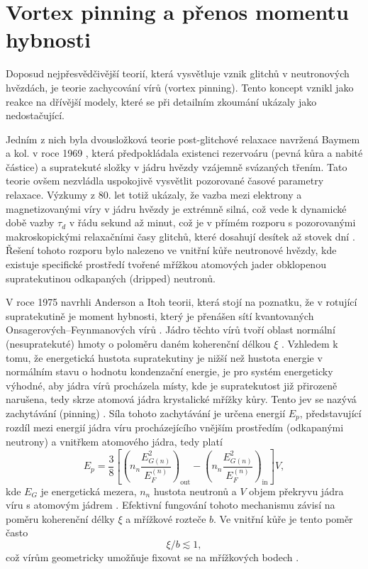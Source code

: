 \documentclass[%
final%
,htext%
]{ipothes}
\begin{document}
\clearpage
\section{Vortex pinning a přenos momentu hybnosti}

Doposud nejpřesvědčivější teorií, která vysvětluje vznik glitchů v neutronových hvězdách, je teorie zachycování vírů (vortex pinning). Tento koncept vznikl jako reakce na dřívější modely, které se při detailním zkoumání ukázaly jako nedostačující.

Jedním z nich byla dvousložková teorie post-glitchové relaxace navržená Baymem a kol. v roce 1969 \cite{baym1969}, která předpokládala existenci rezervoáru (pevná kůra a nabité částice) a supratekuté složky v jádru hvězdy vzájemně svázaných třením. Tato teorie ovšem nezvládla uspokojivě vysvětlit pozorované časové parametry relaxace. Výzkumy z 80. let totiž ukázaly, že vazba mezi elektrony a magnetizovanými víry v jádru hvězdy je extrémně silná, což vede k dynamické době vazby $\tau_d$ v řádu sekund až minut, což je v přímém rozporu s pozorovanými makroskopickými relaxačními časy glitchů, které dosahují desítek až stovek dní \cite{ghosh2007}. Řešení tohoto rozporu bylo nalezeno ve vnitřní kůře neutronové hvězdy, kde existuje specifické prostředí tvořené mřížkou atomových jader obklopenou supratekutinou odkapaných (dripped) neutronů.

V roce 1975 navrhli Anderson a Itoh teorii, která stojí na poznatku, že v rotující supratekutině je moment hybnosti, který je přenášen sítí kvantovaných Onsagerových--Feynmanových vírů \cite{anderson1975}. Jádro těchto vírů tvoří oblast normální (nesupratekuté) hmoty o poloměru daném koherenční délkou $\xi$ \cite{ghosh2007}. Vzhledem k tomu, že energetická hustota supratekutiny je nižší než hustota energie v normálním stavu o hodnotu kondenzační energie, je pro systém energeticky výhodné, aby jádra vírů procházela místy, kde je supratekutost již přirozeně narušena, tedy skrze atomová jádra krystalické mřížky kůry. Tento jev se nazývá zachytávání (pinning) \cite{anderson1975}. Síla tohoto zachytávání je určena energií $E_p$, představující rozdíl mezi energií jádra víru procházejícího vnějším prostředím (odkapanými neutrony) a vnitřkem atomového jádra, tedy platí
\begin{equation}
E_p = \frac{3}{8} \left[ \left( n_n \frac{E_{G(n)}^2}{E_F^{(n)}} \right)_{\mathrm{out}} - \left( n_n \frac{E_{G(n)}^2}{E_F^{(n)}} \right)_{\mathrm{in}} \right] V,
\end{equation}
kde $E_G$ je energetická mezera, $n_n$ hustota neutronů a $V$ objem překryvu jádra víru s atomovým jádrem \cite{ghosh2007}. Efektivní fungování tohoto mechanismu závisí na poměru koherenční délky $\xi$ a mřížkové rozteče $b$. Ve vnitřní kůře je tento poměr často
\begin{equation}
\xi / b \lesssim 1,
\end{equation}
což vírům geometricky umožňuje fixovat se na mřížkových bodech \cite{ghosh2007}.
\end{document}
